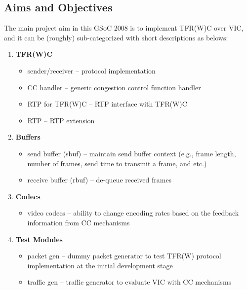 
\subsection{\label{ssec:aims}Aims and Objectives}

The main project aim in this GSoC 2008 is to implement TFR(W)C over VIC, and it
can be (roughly) sub-categorized with short descriptions as belows:

\begin{enumerate} %

\item \textbf{TFR(W)C}

\begin{itemize}
\item \textsf{sender/receiver} -- protocol implementation 
\item \textsf{CC handler} -- generic congestion control function handler
\item \textsf{RTP for TFR(W)C} -- RTP interface with TFR(W)C
\item \textsf{RTP} -- RTP extension 
\end{itemize}

\item \textbf{Buffers}
\begin{itemize}
\item \textsf{send buffer (sbuf)} --  maintain send buffer context (e.g., frame
length, number of frames, send time to transmit a frame, and etc.)
\item \textsf{receive buffer (rbuf)} -- de-queue received frames
\end{itemize}

\item \textbf{Codecs}
\begin{itemize}
\item \textsf{video codecs} -- ability to change encoding rates based on the 
feedback information from CC mechanisms
\end{itemize}

\item \textbf{Test Modules}
\begin{itemize}
\item \textsf{packet gen} -- dummy packet generator to test TFR(W) protocol
implementation at the initial development stage
\item \textsf{traffic gen} -- traffic generator to evaluate VIC with CC
mechanisms
\end{itemize}

\end{enumerate} %

